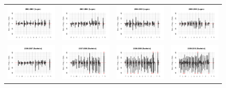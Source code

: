 \documentclass[letter,12pt]{article}
\begin{document}
\begin{figure}
\begin{center}
\begin{tabular}{cccc}
    \includegraphics[width=.22\columnwidth]{../graphs/urgenciasHistog2002.pdf} &
    \includegraphics[width=.22\columnwidth]{../graphs/urgenciasHistog2003.pdf} &
    \includegraphics[width=.22\columnwidth]{../graphs/urgenciasHistog2004.pdf} &
    \includegraphics[width=.22\columnwidth]{../graphs/urgenciasHistog2005.pdf} \\
    \includegraphics[width=.22\columnwidth]{../graphs/urgenciasHistog2006.pdf} &
    \includegraphics[width=.22\columnwidth]{../graphs/urgenciasHistog2007.pdf} &
    \includegraphics[width=.22\columnwidth]{../graphs/urgenciasHistog2008.pdf} &
    \includegraphics[width=.22\columnwidth]{../graphs/urgenciasHistog2009.pdf} \\

\end{tabular}
\end{center}
\end{figure}
\end{document}

